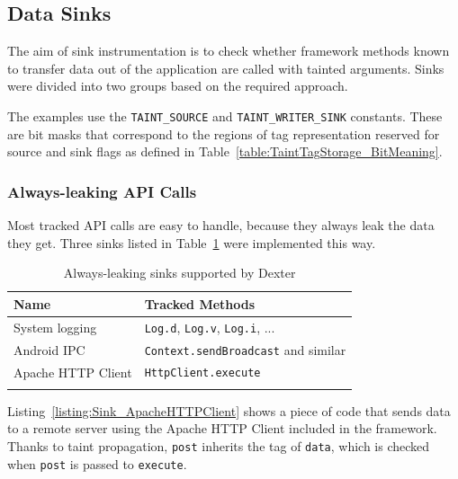 \documentclass[12pt,twoside,notitlepage]{report}
\begin{document}
\subsection{Data Sinks}

The aim of sink instrumentation is to check whether framework methods known to transfer data out of the application are called with tainted arguments. Sinks were divided into two groups based on the required approach.

The examples use the \verb$TAINT_SOURCE$ and \verb$TAINT_WRITER_SINK$ constants. These are bit masks that correspond to the regions of tag representation reserved for source and sink flags as defined in Table~\ref{table:TaintTagStorage_BitMeaning}.

\subsubsection{Always-leaking API Calls}

Most tracked API calls are easy to handle, because they always leak the data they get. Three sinks listed in Table~\ref{table:Sinks_AlwaysLeaking} were implemented this way.

\begin{table}[h]
	\begin{center}
	\begin{tabular}{|l|l|}
		\firsthline
		\textbf{Name}         & \textbf{Tracked Methods} \\
		\hline
		System logging        & \verb$Log.d$, \verb$Log.v$, \verb$Log.i$, ... \\
		Android IPC           & \verb$Context.sendBroadcast$ and similar \\
		Apache HTTP Client    & \verb$HttpClient.execute$ \\
		\lasthline
	\end{tabular}
	\end{center}
	\caption{Always-leaking sinks supported by Dexter}
	\label{table:Sinks_AlwaysLeaking}
\end{table}

Listing~\ref{listing:Sink_ApacheHTTPClient} shows a piece of code that sends data to a remote server using the Apache HTTP Client included in the framework. Thanks to taint propagation, \verb$post$ inherits the tag of \verb$data$, which is checked when \verb$post$ is passed to \verb$execute$.
\end{document}
